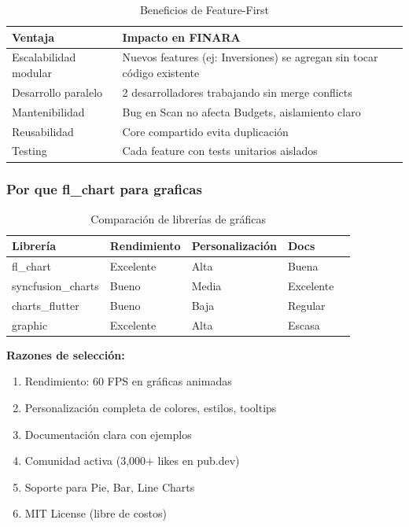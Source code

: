 \begin{table}[H]
\centering
\small
\begin{tabularx}{\textwidth}{|>{\raggedright\arraybackslash}p{4.2cm}|X|}
\hline
\textbf{Ventaja} & \textbf{Impacto en FINARA} \\
\hline
Escalabilidad modular & Nuevos features (ej: Inversiones) se agregan sin tocar código existente \\
\hline
Desarrollo paralelo & 2 desarrolladores trabajando sin merge conflicts \\
\hline
Mantenibilidad & Bug en Scan no afecta Budgets, aislamiento claro \\
\hline
Reusabilidad & Core compartido evita duplicación \\
\hline
Testing & Cada feature con tests unitarios aislados \\
\hline
\end{tabularx}
\caption{Beneficios de Feature-First}
\end{table}

\subsubsection{Por que fl\_chart para graficas}

\begin{table}[H]
\centering
\scriptsize
\begin{tabularx}{\textwidth}{|>{\raggedright\arraybackslash}X|>{\centering\arraybackslash}p{1.6cm}|>{\centering\arraybackslash}p{1.6cm}|>{\centering\arraybackslash}p{1.6cm}|>{\centering\arraybackslash}p{1.2cm}|}
\hline
\textbf{Librería} & \textbf{Rendimiento} & \textbf{Personalización} & \textbf{Docs}\\
\hline
fl\_chart & Excelente & Alta & Buena\\
syncfusion\_charts & Bueno & Media & Excelente\\
charts\_flutter & Bueno & Baja & Regular\\
graphic & Excelente & Alta & Escasa\\
\hline
\end{tabularx}
\caption{Comparación de librerías de gráficas}
\end{table}

\textbf{Razones de selección:}
\begin{enumerate}
    \item Rendimiento: 60 FPS en gráficas animadas
    \item Personalización completa de colores, estilos, tooltips
    \item Documentación clara con ejemplos
    \item Comunidad activa (3,000+ likes en pub.dev)
    \item Soporte para Pie, Bar, Line Charts
    \item MIT License (libre de costos)
\end{enumerate}


